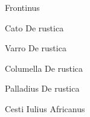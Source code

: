 Frontinus

Cato De rustica

Varro De rustica

Columella De rustica

Palladius De rustica

Cesti Iulius Africanus